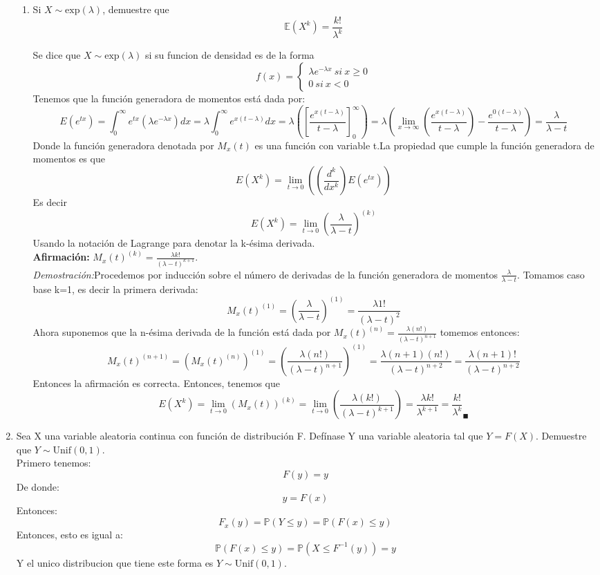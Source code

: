 \documentclass[11pt,a4paper]{report}
\begin{document}
\begin{enumerate}
{\begin{enumerate}
				\item {
					Si $X \sim \text{exp}(\lambda)$, demuestre que
                        $$ \mathbb{E}(X^k) = \frac{k!}{\lambda^k} $$
                        
                        Se dice que $X \sim \text{exp}(\lambda)$ si su funcion de densidad es de la forma $$f(x)= 	\begin{cases}
		\lambda e^{-\lambda x} \ si \ x\geq 0 \\
		0 \ si \ x<0
	\end{cases}$$ Tenemos que la función generadora de momentos está dada por: $$E(e^{tx})=\int_{0}^{\infty}e^{tx}(\lambda e^{-\lambda x}) dx=\lambda \int_{0}^{\infty}e^{x(t-\lambda)}dx=\lambda ([\frac{e^{x(t-\lambda)}}{t-\lambda}]_{0}^{\infty})=\lambda (\lim_{x\rightarrow \infty} (\frac{e^{x(t-\lambda)}}{t-\lambda})-\frac{e^{0(t-\lambda)}}{t-\lambda})=\frac{\lambda}{\lambda-t}$$
	Donde la función generadora denotada por $M_{x}(t)$ es una función con variable t.La propiedad que cumple la función generadora de momentos es que $$E(X^{k})=\lim_{t\rightarrow 0}( (\frac{d^{k}}{dx^{k}}) E(e^{tx}))$$ Es decir 
	$$E(X^{k})=\lim_{t\rightarrow 0}(\frac{\lambda}{\lambda-t})^{(k)}$$ Usando la notación de Lagrange para denotar la k-ésima derivada. \\
	\textbf{Afirmación:} $M_{x}(t)^{(k)}=\frac{\lambda k!}{(\lambda-t)^{k+1}}$. \\
	\textit{Demostración:}Procedemos por inducción sobre el número de derivadas de la función generadora de momentos $\frac{\lambda}{\lambda-t}$. Tomamos caso base k=1, es decir la primera derivada:
	$$M_{x}(t)^{(1)}=(\frac{\lambda}{\lambda-t})^{(1)}=\frac{\lambda 1!}{(\lambda-t)^2}$$ Ahora suponemos que la n-ésima derivada de la función está dada por $M_{x}(t)^{(n)}=\frac{\lambda(n!)}{(\lambda-t)^{n+1}}$ tomemos entonces:
	$$M_{x}(t)^{(n+1)}=(M_{x}(t)^{(n)})^{(1)}=(\frac{\lambda (n!)}{(\lambda-t)^{n+1}})^{(1)}=\frac{\lambda (n+1)(n!)}{(\lambda-t)^{n+2}}=\frac{\lambda (n+1)!}{(\lambda-t)^{n+2}}$$ Entonces la afirmación es correcta. Entonces, tenemos que $$E(X^{k})=\lim_{t\rightarrow 0}(M_{x}(t))^{(k)}=\lim_{t \rightarrow 0}(\frac{\lambda(k!)}{(\lambda-t)^{k+1}})=\frac{\lambda k!}{\lambda^{k+1}}=\frac{k!}{\lambda^{k}}_{\blacksquare}$$
				}

			\end{enumerate}
		}

		\item{
			Sea X una variable aleatoria continua con función de distribución F.
            Defínase Y una variable aleatoria tal que $Y = F(X)$. Demuestre que
            $Y \sim \text{Unif}(0,1)$.
            \\
            Primero tenemos:
            \[F(y) = y\]
            De donde:
            \[y = F(x)\]
            Entonces:
            \[F_{x}(y) = \mathbb{P}(Y \leq y) = \mathbb{P}(F(x) \leq y)\]
            Entonces, esto es igual a:
            \[\mathbb{P}(F(x) \leq y) = \mathbb{P}(X \leq F^{-1}(y)) = y\]
            Y el unico distribucion que tiene este forma es $Y \sim \text{Unif}(0,1)$.
            
}
\end{enumerate}
\end{document}
